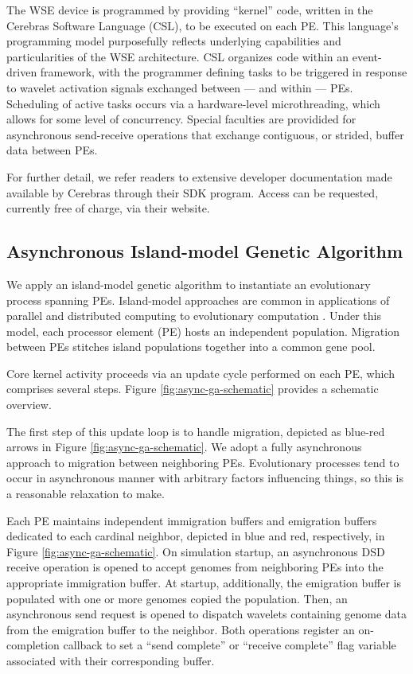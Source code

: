The WSE device is programmed by providing ``kernel'' code, written in the Cerebras Software Language (CSL), to be executed on each PE.
This language's programming model purposefully reflects underlying capabilities and particularities of the WSE architecture.
CSL organizes code within an event-driven framework, with the programmer defining tasks to be triggered in response to wavelet activation signals exchanged between --- and within --- PEs.
Scheduling of active tasks occurs via a hardware-level microthreading, which allows for some level of concurrency.
Special faculties are providided for asynchronous send-receive operations that exchange contiguous, or strided, buffer data between PEs.

For further detail, we refer readers to extensive developer documentation made available by Cerebras through their SDK program.
Access can be requested, currently free of charge, via their website.

\subsection{Asynchronous Island-model Genetic Algorithm}


We apply an island-model genetic algorithm to instantiate an evolutionary process spanning PEs.
Island-model approaches are common in applications of parallel and distributed computing to evolutionary computation \citep{bennett1999building}.
Under this model, each processor element (PE) hosts an independent population.
Migration between PEs stitches island populations together into a common gene pool.

Core kernel activity proceeds via an update cycle performed on each PE, which comprises several steps.
Figure \ref{fig:async-ga-schematic} provides a schematic overview.

The first step of this update loop is to handle migration, depicted as blue-red arrows in Figure \ref{fig:async-ga-schematic}.
We adopt a fully asynchronous approach to migration between neighboring PEs.
Evolutionary processes tend to occur in asynchronous manner with arbitrary factors influencing things, so this is a reasonable relaxation to make.

Each PE maintains independent immigration buffers and emigration buffers dedicated to each cardinal neighbor, depicted in blue and red, respectively, in Figure \ref{fig:async-ga-schematic}.
On simulation startup, an asynchronous DSD receive operation is opened to accept genomes from neighboring PEs into the appropriate immigration buffer.
At startup, additionally, the emigration buffer is populated with one or more genomes copied the population.
Then, an asynchronous send request is opened to dispatch wavelets containing genome data from the emigration buffer to the neighbor.
Both operations register an on-completion callback to set a ``send complete'' or ``receive complete'' flag variable associated with their corresponding buffer.

